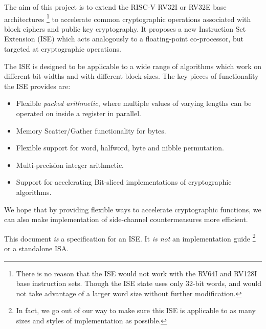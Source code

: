 

The aim of this project is to
extend the RISC-V RV32I or RV32E base architectures \footnote{
 There is no reason that the ISE would not work with the
 RV64I and RV128I base instruction sets.
 Though the ISE state uses only 32-bit words,
 and would not take advantage of a larger word size without
 further modification.
} 
to accelerate common cryptographic
operations associated with block ciphers and public key cryptography.
It proposes a new Instruction Set Extension (ISE)
which acts analogously to a floating-point co-processor,
but targeted at cryptographic operations.

The ISE is designed to be applicable to a wide range of algorithms
which work on different bit-widths and with different block sizes.
The key pieces of functionality the ISE provides are:

\begin{itemize}
\item Flexible {\em packed arithmetic},
    where multiple values of varying lengths can
    be operated on inside a register in parallel.
\item Memory Scatter/Gather functionality for bytes.
\item Flexible support for word, halfword, byte and nibble permutation.
\item Multi-precision integer arithmetic.
\item Support for accelerating Bit-sliced implementations of cryptographic
    algorithms.
\end{itemize}

We hope that by providing flexible ways to accelerate cryptographic functions,
we can also make implementation of side-channel countermeasures
more efficient.

This document {\em is} a specification for an ISE.
It {\em is not} an implementation guide
\footnote{In fact, we go out of our way to make sure this
ISE is applicable to as many sizes and styles of implementation as possible.}
or a standalone ISA.
